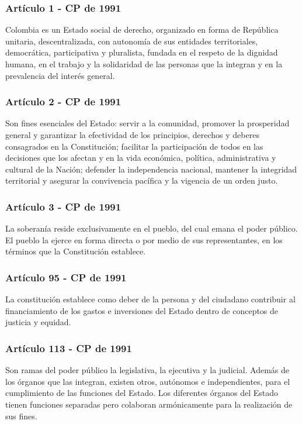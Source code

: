 \documentclass{beamer}
\begin{document}
\begin{frame}
  \frametitle{Art\'iculo 1 - CP de 1991}
  Colombia es un Estado social de derecho, organizado en forma de Rep\'ublica unitaria, descentralizada, con autonom\'ia de sus entidades territoriales, democr\'atica, participativa y pluralista, fundada en el respeto de la dignidad humana, en el trabajo y la solidaridad de las personas que la integran y en la prevalencia del inter\'es general.
\end{frame}

\begin{frame}
  \frametitle{Art\'iculo 2 - CP de 1991}
  Son fines esenciales del Estado: servir a la comunidad, promover la prosperidad general y garantizar la efectividad de los principios, derechos y deberes consagrados en la Constituci\'on; facilitar la participaci\'on de todos en las decisiones que los afectan y en la vida econ\'omica, pol\'itica, administrativa y cultural de la Naci\'on; defender la independencia nacional, mantener la integridad territorial y asegurar la convivencia pac\'ifica y la vigencia de un orden justo.
\end{frame}

\begin{frame}
  \frametitle{Art\'iculo 3 - CP de 1991}
  La soberan\'ia reside exclusivamente en el pueblo, del cual emana el poder p\'ublico. El pueblo la ejerce en forma directa o por medio de sus representantes, en los t\'erminos que la Constituci\'on establece.
\end{frame}

\begin{frame}
  \frametitle{Art\'iculo 95 - CP de 1991}
  La constituci\'on establece como deber de la persona y del ciudadano contribuir al financiamiento de los gastos e inversiones del Estado dentro de conceptos de justicia y equidad.
\end{frame}

\begin{frame}
  \frametitle{Art\'iculo 113 - CP de 1991}
  Son ramas del poder p\'ublico la legislativa, la ejecutiva y la judicial. Adem\'as de los \'organos que las integran, existen otros, aut\'onomos e independientes, para el cumplimiento de las funciones del Estado. Los diferentes \'organos del Estado tienen funciones separadas pero colaboran arm\'onicamente para la realizaci\'on de sus fines.
\end{frame}
\end{document}
